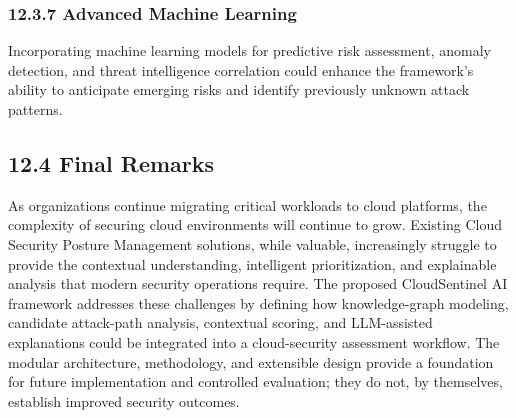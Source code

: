 \subsubsection{12.3.7 Advanced Machine Learning}

Incorporating machine learning models for predictive risk assessment, anomaly detection, and threat intelligence correlation could enhance the framework's ability to anticipate emerging risks and identify previously unknown attack patterns.

\subsection{12.4 Final Remarks}

As organizations continue migrating critical workloads to cloud platforms, the complexity of securing cloud environments will continue to grow. Existing Cloud Security Posture Management solutions, while valuable, increasingly struggle to provide the contextual understanding, intelligent prioritization, and explainable analysis that modern security operations require. The proposed CloudSentinel AI framework addresses these challenges by defining how knowledge-graph modeling, candidate attack-path analysis, contextual scoring, and LLM-assisted explanations could be integrated into a cloud-security assessment workflow. The modular architecture, methodology, and extensible design provide a foundation for future implementation and controlled evaluation; they do not, by themselves, establish improved security outcomes.

